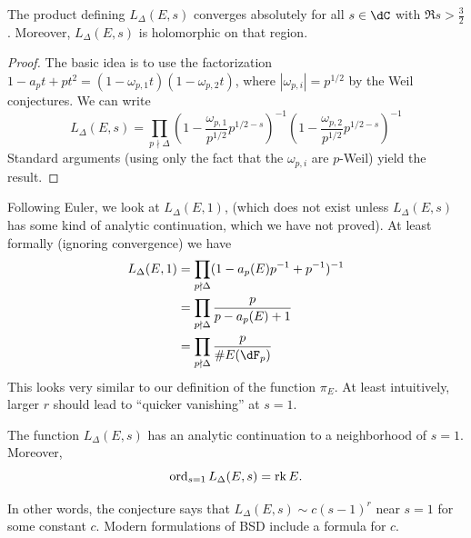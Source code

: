 \begin{lemma}
The product defining $L_\Delta(E,s)$ converges absolutely for all $s\in \dC$ 
with $\Re s>\frac 3 2$. Moreover, $L_\Delta(E,s)$ is holomorphic on that 
region. 
\end{lemma}
\begin{proof}
The basic idea is to use the factorization 
$1-a_p t + p t^2 = (1-\omega_{p,1} t)(1-\omega_{p,2}t)$, where  
$|\omega_{p,i}| = p^{1/2}$ by the Weil conjectures. We can write  
\[
  L_\Delta(E,s) = \prod_{p\nmid \Delta} \left(1-\frac{\omega_{p,1}}{p^{1/2}} p^{1/2-s}\right)^{-1}\left( 1-\frac{\omega_{p,2}}{p^{1/2}} p^{1/2-s}\right)^{-1}
\]
Standard arguments (using only the fact that the $\omega_{p,i}$ are $p$-Weil) 
yield the result. 
\end{proof}

Following Euler, we look at $L_\Delta(E,1)$, (which does not exist unless 
$L_\Delta(E,s)$ has some kind of analytic continuation, which we have not 
proved). At least formally (ignoring convergence) we have 
\begin{align*}
  L_\Delta(E,1) &= \prod_{p\nmid \Delta} (1-a_p(E) p^{-1} + p^{-1})^{-1} \\
    &= \prod_{p\nmid \Delta} \frac{p}{p-a_p(E)+1} \\
    &= \prod_{p\nmid \Delta} \frac{p}{\# E(\dF_p)}
\end{align*}
This looks very similar to our definition of the function $\pi_E$. At least 
intuitively, larger $r$ should lead to ``quicker vanishing'' at $s=1$. 

\begin{conjecture}
The function $L_\Delta(E,s)$ has an analytic continuation to a neighborhood of 
$s=1$. Moreover, 
\[
  \operatorname{ord}_{s=1} L_\Delta(E,s) = \operatorname{rk} E \text{.}
\]
\end{conjecture}

In other words, the conjecture says that $L_\Delta(E,s)\sim c(s-1)^r$ near 
$s=1$ for some constant $c$. Modern formulations of BSD include a formula for 
$c$. 

